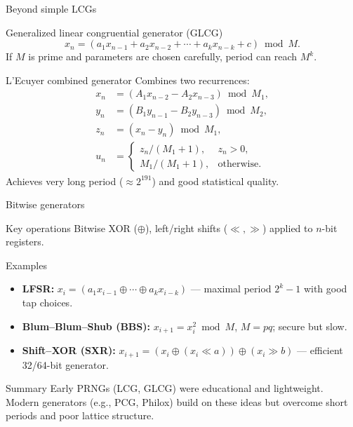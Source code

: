 \documentclass[aspectratio=169]{beamer}
\begin{document}
\begin{frame}{Beyond simple LCGs}
\begin{block}{Generalized linear congruential generator (GLCG)}
\[
x_n = (a_1x_{n-1}+a_2x_{n-2}+\cdots+a_kx_{n-k}+c)\bmod M.
\]
If $M$ is prime and parameters are chosen carefully, period can reach $M^k$.
\end{block}

\begin{block}{L'Ecuyer combined generator}
Combines two recurrences:
\[
\begin{aligned}
x_n &= (A_1x_{n-2}-A_2x_{n-3}) \bmod M_1,\\
y_n &= (B_1y_{n-1}-B_2y_{n-3}) \bmod M_2,\\
z_n &= (x_n - y_n) \bmod M_1,\\
u_n &=
  \begin{cases}
  z_n / (M_1+1), & z_n>0,\\
  M_1/(M_1+1), & \text{otherwise.}
  \end{cases}
\end{aligned}
\]
Achieves very long period ($\approx 2^{191}$) and good statistical quality.
\end{block}
\end{frame}

\begin{frame}{Bitwise generators}
\begin{block}{Key operations}
Bitwise XOR ($\oplus$), left/right shifts ($\ll,\gg$) applied to $n$-bit registers.
\end{block}

\begin{block}{Examples}
\begin{itemize}
  \item \textbf{LFSR:} $x_i = (a_1x_{i-1}\oplus \cdots \oplus a_kx_{i-k})$ — maximal period $2^k-1$ with good tap choices.
  \item \textbf{Blum–Blum–Shub (BBS):} $x_{i+1}=x_i^2\bmod M$, $M=pq$; secure but slow.
  \item \textbf{Shift–XOR (SXR):} $x_{i+1}=(x_i\oplus(x_i\ll a))\oplus(x_i\gg b)$ — efficient 32/64-bit generator.
\end{itemize}
\end{block}

\begin{block}{Summary}
Early PRNGs (LCG, GLCG) were educational and lightweight.
Modern generators (e.g., PCG, Philox) build on these ideas but overcome short periods and poor lattice structure.
\end{block}
\end{frame}
\end{document}
